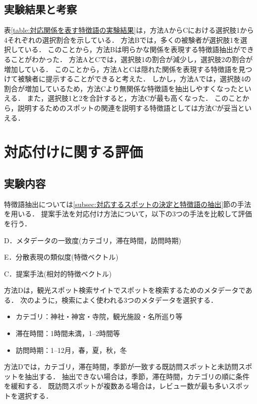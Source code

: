\documentclass[submit]{ipsj}
\begin{document}
\subsection{実験結果と考察}
表\ref{table:対応関係を表す特徴語の実験結果}は，方法AからCにおける選択肢1から4それぞれの選択割合を示している．
方法Bでは，多くの被験者が選択肢1を選択している．
このことから，方法Bは明らかな関係を表現する特徴語抽出ができることがわかった．
方法AとCでは，選択肢1の割合が減少し，選択肢2の割合が増加している．
このことから，方法AとCは隠れた関係を表現する特徴語を見つけて被験者に提示することができると考えた．
しかし，方法Aでは，選択肢4の割合が増加しているため，方法Cより無関係な特徴語を抽出しやすくなったといえる．
また，選択肢1と2を合計すると，方法Cが最も高くなった．
このことから，説明するためのスポットの関連を説明する特徴語としては方法Cが妥当といえる．

\section{対応付けに関する評価}
\label{sec:対応付けに関する評価}
\subsection{実験内容}
特徴語抽出については\ref{subsec:対応するスポットの決定と特徴語の抽出}節の手法を用いる．
提案手法を対応付け方法について，以下の3つの手法を比較して評価を行う．
\begin{description}
  \item D．メタデータの一致度(カテゴリ，滞在時間，訪問時期)
  \item E．分散表現の類似度(特徴ベクトル)
  \item C．提案手法(相対的特徴ベクトル)
\end{description}

方法Dは，観光スポット検索サイトでスポットを検索するためのメタデータである．
次のように，検索によく使われる3つのメタデータを選択する．
\begin{itemize}
 \item カテゴリ：神社・神宮・寺院，観光施設・名所巡り等
 \item 滞在時間：1時間未満，1--2時間等
 \item 訪問時期：1--12月，春，夏，秋，冬
\end{itemize}

方法Dでは，カテゴリ，滞在時間，季節が一致する既訪問スポットと未訪問スポットを抽出する．
抽出できない場合は，季節，滞在時間，カテゴリの順に条件を緩和する．
既訪問スポットが複数ある場合は，レビュー数が最も多いスポットを選択する．
\end{document}
